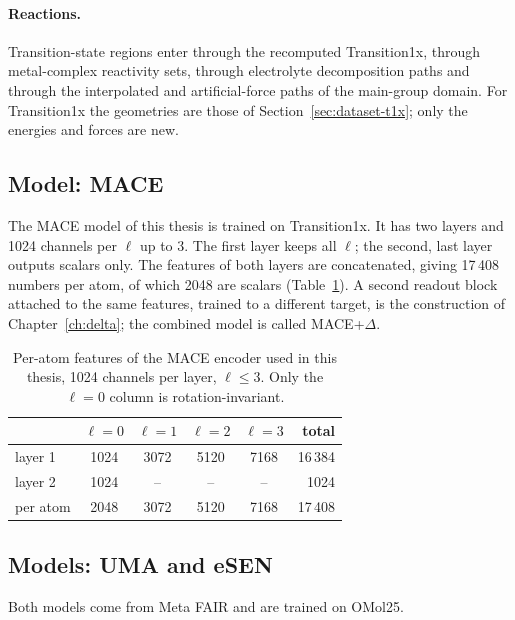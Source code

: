 \paragraph{Reactions.} Transition-state regions enter through the
recomputed Transition1x, through metal-complex reactivity sets, through
electrolyte decomposition paths and through the interpolated and
artificial-force paths of the main-group domain. For Transition1x the
geometries are those of Section~\ref{sec:dataset-t1x}; only the energies
and forces are new.

\subsection{Model: MACE}
\label{sec:model-mace}

The MACE model of this thesis is trained on Transition1x. It has two
layers and 1024 channels per $\ell$ up to 3. The first layer keeps all
$\ell$; the second, last layer outputs scalars only. The features of both
layers are concatenated, giving 17\,408 numbers per atom, of which 2048
are scalars (Table~\ref{tab:mace-features}). A second readout block
attached to the same features, trained to a different target, is the
construction of Chapter~\ref{ch:delta}; the combined model is called
MACE+$\Delta$.

\begin{table}[h]
\centering
\caption{Per-atom features of the MACE encoder used in this thesis, 1024
channels per layer, $\ell \le 3$. Only the $\ell = 0$ column is
rotation-invariant.}
\label{tab:mace-features}
\begin{tabular}{@{}lccccr@{}}
\toprule
 & $\ell = 0$ & $\ell = 1$ & $\ell = 2$ & $\ell = 3$ & total \\
\midrule
layer 1 & 1024 & 3072 & 5120 & 7168 & 16\,384 \\
layer 2 & 1024 & --   & --   & --   & 1024 \\
\midrule
per atom & 2048 & 3072 & 5120 & 7168 & 17\,408 \\
\bottomrule
\end{tabular}
\end{table}

\subsection{Models: UMA and eSEN}
\label{sec:model-uma-esen}

Both models come from Meta FAIR and are trained on OMol25.

